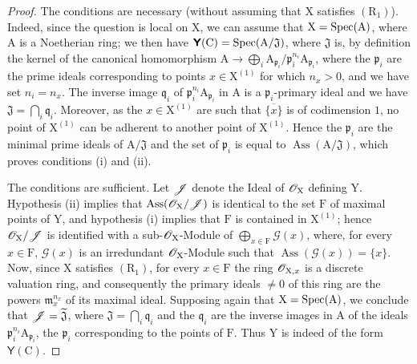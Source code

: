 \begin{proof}
The conditions are necessary (without assuming that $\mathrm{X}$ satisfies $(\mathrm{R}_1)$).
Indeed, since the question is local on $\mathrm{X}$, we can assume that $\mathrm{X}=\operatorname{Spec}(\mathrm{A})$, where $\mathrm{A}$ is a Noetherian ring;
we then have $\boldsymbol{\mathsf{Y}}(\mathrm{C})=\operatorname{Spec}(\mathrm{A}/\mathfrak{J})$, where $\mathfrak{J}$ is, by definition  the kernel of the canonical homomorphism $\mathrm{A}\to\bigoplus_i\mathrm{A}_{\mathfrak{p}_i}/\mathfrak{p}_i^{n_i}\mathrm{A}_{\mathfrak{p}_i}$, where the $\mathfrak{p}_i$ are the prime ideals corresponding to points $x\in\mathrm{X}^{(1)}$ for which $n_x>0$, and we have set $n_i=n_x$.
The inverse image $\mathfrak{q}_i$ of $\mathfrak{p}_i^{n_i}\mathrm{A}_{\mathfrak{p}_i}$ in $\mathrm{A}$ is a $\mathfrak{p}_i$-primary ideal and we have $\mathfrak{J}=\bigcap_i\mathfrak{q}_i$.
Moreover, as the $x\in\mathrm{X}^{(1)}$ are such that $\overline{\{x\}}$ is of codimension $1$, no point of $\mathrm{X}^{(1)}$ can be adherent to another point of $\mathrm{X}^{(1)}$.
Hence the $\mathfrak{p}_i$ are the minimal prime ideals of $\mathrm{A}/\mathfrak{J}$ and the set of $\mathfrak{p}_i$ is equal to $\operatorname{Ass}(\mathrm{A}/\mathfrak{J})$, which proves conditions (i) and (ii).

The conditions are sufficient.
Let $\mathscr{J}$ denote the Ideal of $\mathscr{O}_\mathrm{X}$ defining $\mathrm{Y}$.
Hypothesis (ii) implies that $\operatorname{Ass}(\mathscr{O}_\mathrm{X}/\mathscr{J})$ is identical to the set $\mathrm{F}$ of maximal points of $\mathrm{Y}$, and hypothesis (i) implies that $\mathrm{F}$ is contained in $\mathrm{X}^{(1)}$;
hence  $\mathscr{O}_\mathrm{X}/\mathscr{J}$ is identified with a sub-$\mathscr{O}_\mathrm{X}$-Module of $\bigoplus_{x\in\mathrm{F}}\mathscr{G}(x)$, where, for every $x\in\mathrm{F}$, $\mathscr{G}(x)$ is an irredundant $\mathscr{O}_\mathrm{X}$-Module such that $\operatorname{Ass}(\mathscr{G}(x))=\{x\}$.
Now, since $\mathrm{X}$ satisfies $(\mathrm{R}_1)$, for every $x\in\mathrm{F}$ the ring $\mathscr{O}_{\mathrm{X},x}$ is a discrete valuation ring, and consequently the primary ideals $\neq 0$ of this ring are the powers $\mathfrak{m}_x^{n_x}$ of its maximal ideal.
Supposing again that $\mathrm{X}=\operatorname{Spec}(\mathrm{A})$, we conclude that $\mathscr{J}=\widetilde{\mathfrak{J}}$, where $\mathfrak{J}=\bigcap_i\mathfrak{q}_i$ and the $\mathfrak{q}_i$ are the inverse images in $\mathrm{A}$ of the ideals $\mathfrak{p}_i^{n_i}\mathrm{A}_{\mathfrak{p}_i}$, the $\mathfrak{p}_i$ corresponding to the points of $\mathrm{F}$.
Thus $\mathrm{Y}$ is indeed of the form $\boldsymbol{\mathsf{Y}}(\mathrm{C})$.
\end{proof}

